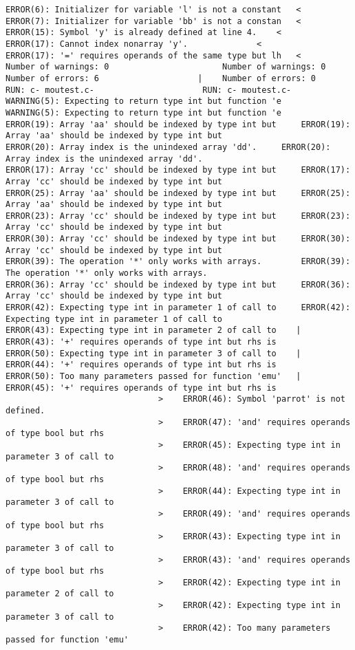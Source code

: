 \documentclass[12pt]{book}
\begin{document}
\begin{lstlisting}
ERROR(6): Initializer for variable 'l' is not a constant   <
ERROR(7): Initializer for variable 'bb' is not a constan   <
ERROR(15): Symbol 'y' is already defined at line 4.	   <
ERROR(17): Cannot index nonarray 'y'.			   <
ERROR(17): '=' requires operands of the same type but lh   <
Number of warnings: 0						Number of warnings: 0
Number of errors: 6					   |	Number of errors: 0
RUN: c- moutest.c-						RUN: c- moutest.c-
WARNING(5): Expecting to return type int but function 'e	WARNING(5): Expecting to return type int but function 'e
ERROR(19): Array 'aa' should be indexed by type int but 	ERROR(19): Array 'aa' should be indexed by type int but 
ERROR(20): Array index is the unindexed array 'dd'.		ERROR(20): Array index is the unindexed array 'dd'.
ERROR(17): Array 'cc' should be indexed by type int but 	ERROR(17): Array 'cc' should be indexed by type int but 
ERROR(25): Array 'aa' should be indexed by type int but 	ERROR(25): Array 'aa' should be indexed by type int but 
ERROR(23): Array 'cc' should be indexed by type int but 	ERROR(23): Array 'cc' should be indexed by type int but 
ERROR(30): Array 'cc' should be indexed by type int but 	ERROR(30): Array 'cc' should be indexed by type int but 
ERROR(39): The operation '*' only works with arrays.		ERROR(39): The operation '*' only works with arrays.
ERROR(36): Array 'cc' should be indexed by type int but 	ERROR(36): Array 'cc' should be indexed by type int but 
ERROR(42): Expecting type int in parameter 1 of call to 	ERROR(42): Expecting type int in parameter 1 of call to 
ERROR(43): Expecting type int in parameter 2 of call to    |	ERROR(43): '+' requires operands of type int but rhs is 
ERROR(50): Expecting type int in parameter 3 of call to    |	ERROR(44): '+' requires operands of type int but rhs is 
ERROR(50): Too many parameters passed for function 'emu'   |	ERROR(45): '+' requires operands of type int but rhs is 
							   >	ERROR(46): Symbol 'parrot' is not defined.
							   >	ERROR(47): 'and' requires operands of type bool but rhs 
							   >	ERROR(45): Expecting type int in parameter 3 of call to 
							   >	ERROR(48): 'and' requires operands of type bool but rhs 
							   >	ERROR(44): Expecting type int in parameter 3 of call to 
							   >	ERROR(49): 'and' requires operands of type bool but rhs 
							   >	ERROR(43): Expecting type int in parameter 3 of call to 
							   >	ERROR(43): 'and' requires operands of type bool but rhs 
							   >	ERROR(42): Expecting type int in parameter 2 of call to 
							   >	ERROR(42): Expecting type int in parameter 3 of call to 
							   >	ERROR(42): Too many parameters passed for function 'emu'

\end{lstlisting}
\end{document}
